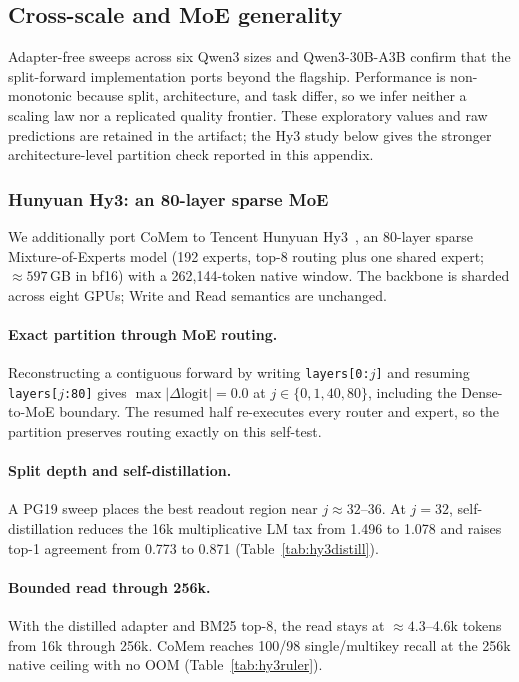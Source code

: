 \subsection{Cross-scale and MoE generality}
\label{app:generality}
Adapter-free sweeps across six Qwen3 sizes and Qwen3-30B-A3B confirm that the
split-forward implementation ports beyond the flagship. Performance is
non-monotonic because split, architecture, and task differ, so we infer neither
a scaling law nor a replicated quality frontier. These exploratory values and
raw predictions are retained in the artifact; the Hy3 study below gives the
stronger architecture-level partition check reported in this appendix.

\subsubsection{Hunyuan Hy3: an 80-layer sparse MoE}
\label{sec:hy3-general}
We additionally port CoMem to Tencent Hunyuan Hy3~\citep{hunyuan}, an 80-layer sparse
Mixture-of-Experts model (192 experts, top-8 routing plus one shared expert;
$\approx597$\,GB in bf16) with a 262,144-token native window. The backbone is
sharded across eight GPUs; Write and Read semantics are unchanged.

\paragraph{Exact partition through MoE routing.}
Reconstructing a contiguous forward by writing \texttt{layers[0:$j$]} and
resuming \texttt{layers[$j$:80]} gives
$\max|\Delta\mathrm{logit}|=0.0$ at $j\in\{0,1,40,80\}$, including the
Dense-to-MoE boundary. The resumed half re-executes every router and expert, so
the partition preserves routing exactly on this self-test.

\paragraph{Split depth and self-distillation.}
A PG19 sweep places the best readout region near $j\approx32$--36. At $j=32$,
self-distillation reduces the 16k multiplicative LM tax from 1.496 to 1.078 and
raises top-1 agreement from 0.773 to 0.871
(Table~\ref{tab:hy3distill}).



\paragraph{Bounded read through 256k.}
With the distilled adapter and BM25 top-8, the read stays at
$\approx4.3$--4.6k tokens from 16k through 256k. CoMem reaches 100/98
single/multikey recall at the 256k native ceiling with no OOM
(Table~\ref{tab:hy3ruler}).



\FloatBarrier
